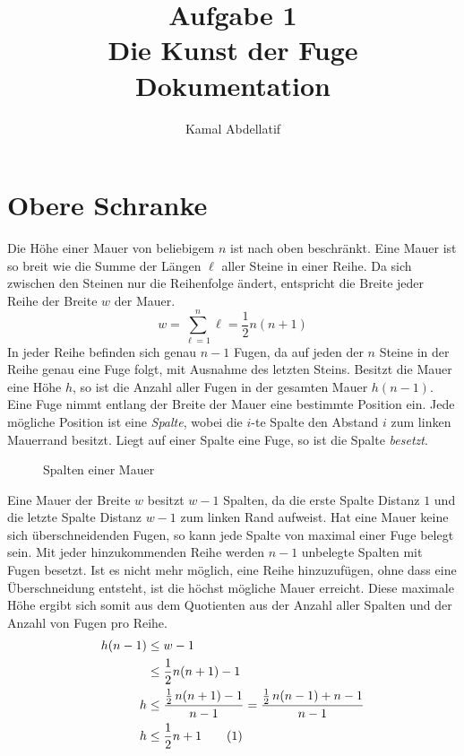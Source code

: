 \documentclass[a4paper, 12pt]{scrartcl}
\title{Aufgabe 1\\Die Kunst der Fuge\\Dokumentation}
\author{Kamal Abdellatif}
\date{}
\newcommand{\numberthis}{\addtocounter{equation}{1}\tag{\theequation}}
\numberwithin{equation}{section}
\begin{document}
\maketitle
\section{Obere Schranke}
Die Höhe einer Mauer von beliebigem $n$ ist nach oben beschränkt. Eine Mauer ist so breit wie die Summe der Längen $\ell$ aller Steine in einer Reihe. Da sich zwischen den Steinen nur die Reihenfolge ändert, entspricht die Breite jeder Reihe der Breite $w$ der Mauer.
\begin{equation}\label{eq:width}
	w = \sum_{\ell = 1}^n \ell = \frac{1}{2}n(n+1)
\end{equation}
In jeder Reihe befinden sich genau $n-1$ Fugen, da auf jeden der $n$ Steine in der Reihe genau eine Fuge folgt, mit Ausnahme des letzten Steins. Besitzt die Mauer eine Höhe $h$, so ist die Anzahl aller Fugen in der gesamten Mauer $h(n-1)$.\\
Eine Fuge nimmt entlang der Breite der Mauer eine bestimmte Position ein. Jede mögliche Position ist eine \emph{Spalte}, wobei die $i$-te Spalte den Abstand $i$ zum linken Mauerrand besitzt. Liegt auf einer Spalte eine Fuge, so ist die Spalte \emph{besetzt}.
\begin{figure}[H]
	\centering
	\caption{Spalten einer Mauer}
\end{figure}
Eine Mauer der Breite $w$ besitzt $w-1$ Spalten, da die erste Spalte Distanz $1$ und die letzte Spalte Distanz $w-1$ zum linken Rand aufweist.
Hat eine Mauer keine sich überschneidenden Fugen, so kann jede Spalte von maximal einer Fuge belegt sein. Mit jeder hinzukommenden Reihe werden $n-1$ unbelegte Spalten mit Fugen besetzt. Ist es nicht mehr möglich, eine Reihe hinzuzufügen, ohne dass eine Überschneidung entsteht, ist die höchst mögliche Mauer erreicht. Diese maximale Höhe ergibt sich somit aus dem Quotienten aus der Anzahl aller Spalten und der Anzahl von Fugen pro Reihe.
\begin{align*}
	h(n-1) &\le w-1 \\
	&\le \frac{1}{2}n(n+1) -1 \\
	h &\le \frac{\frac{1}{2}\,n(n+1)-1}{n-1} = \frac{\frac{1}{2}\,n(n-1)+n-1}{n-1} \\
	h &\le \frac{1}{2}n + 1 \numberthis\label{eq:schranke}
\end{align*}
\end{document}
